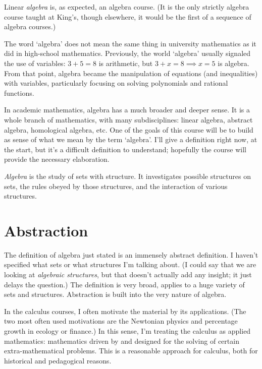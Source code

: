 \documentclass[fleqn]{report}
\begin{document}
Linear \emph{algebra} is, as expected, an algebra course. (It
is the only strictly algebra course taught at King's, though
elsewhere, it would be the first of a sequence of algebra
courses.)

The word `algebra' does not mean the same thing in university
mathematics as it did in high-school mathematics. Previously,
the world `algebra' usually signaled the use of variables:
$3+5 = 8$ is arithmetic, but $3 + x = 8 \implies x = 5$ is
algebra. From that point, algebra became the manipulation of
equations (and inequalities) with variables, particularly
focusing on solving polynomials and rational functions.

In academic mathematics, algebra has a much broader and deeper
sense. It is a whole branch of mathematics, with many
subdisciplines: linear algebra, abstract algebra, homological
algebra, etc. One of the goals of this course will be to build
as sense of what we mean by the term `algebra'. I'll give a
definition right now, at the start, but it's a difficult
definition to understand; hopefully the course will provide
the necessary elaboration.

\begin{defn}
\emph{Algebra} is the study of sets with structure. It
investigates possible structures on sets, the rules obeyed by
those structures, and the interaction of various structures. 
\end{defn}

\section{Abstraction}

The definition of algebra just stated is an immensely
abstract definition. I haven't specified what sets or what
structures I'm talking about. (I could say that we are looking
at \emph{algebraic structures}, but that doesn't actually add
any insight; it just delays the question.) The definition is
very broad, applies to a huge variety of sets and structures.
Abstraction is built into the very nature of algebra. 

In the calculus courses, I often motivate the material by its
applications. (The two most often used motivations are the
Newtonian physics and percentage growth in ecology or
finance.) In this sense, I'm treating the calculus as applied
mathematics: mathematics driven by and designed for the
solving of certain extra-mathematical problems. This is a
reasonable approach for calculus, both for historical and
pedagogical reasons. 
\end{document}

